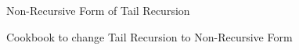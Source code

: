 \begin{frame}{Non-Recursive Form of Tail Recursion}
\begin{block}{Cookbook to change Tail Recursion to Non-Recursive Form}
\begin{itemize}
{\begin{columns}
    \begin{column}{.001\linewidth}~\end{column}
  \end{columns}
}

  \end{itemize}
  \end{block}
\end{frame}
